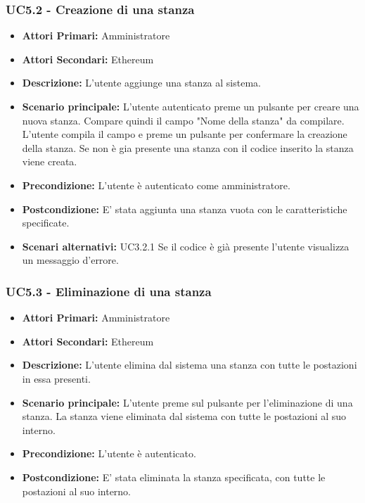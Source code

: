 \subsubsection{ UC5.2 - Creazione di una stanza}
\begin{itemize}
	\item\textbf{Attori Primari:}
	Amministratore 
	\item\textbf{Attori Secondari:}
	Ethereum
	\item\textbf{Descrizione:} 
	L'utente aggiunge una stanza al sistema.
	\item\textbf{Scenario principale:} 
	L'utente autenticato preme un pulsante per creare una nuova stanza. Compare quindi il campo "Nome della stanza" da compilare.
	L'utente compila il campo e preme un pulsante per confermare la creazione della stanza.
	Se non è gia presente una stanza con il codice inserito la stanza viene creata.
	\item\textbf{Precondizione:} 
	L'utente è autenticato come amministratore.
	\item\textbf{Postcondizione:}
	E' stata aggiunta una stanza vuota con le caratteristiche specificate.
	\item\textbf{Scenari alternativi:}
	UC3.2.1 Se il codice è già presente l'utente visualizza un messaggio d'errore.
\end{itemize}

\subsubsection{ UC5.3 - Eliminazione di una stanza}
\begin{itemize}
	\item\textbf{Attori Primari:}
	Amministratore 
	\item\textbf{Attori Secondari:}
	Ethereum
	\item\textbf{Descrizione:} 
	L'utente elimina dal sistema una stanza con tutte le postazioni in essa presenti.
	\item\textbf{Scenario principale:} 
	L'utente preme sul pulsante per l'eliminazione di una stanza. La stanza viene eliminata dal sistema con tutte le postazioni al suo interno.
	\item\textbf{Precondizione:} 
	L'utente è autenticato.
	\item\textbf{Postcondizione:}
	E' stata eliminata la stanza specificata, con tutte le postazioni al suo interno.
\end{itemize}

